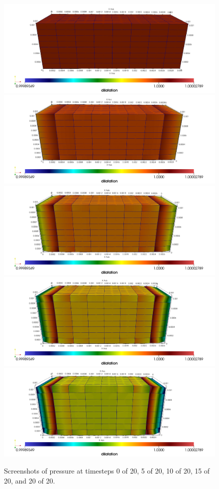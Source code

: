 \documentclass[letterpaper,11pt,oneside,titlepage]{report}
\begin{document}
{\begin{figure}
  \centering
  \includegraphics[height=0.18\textheight]{figs/00-D.png}
  \includegraphics[height=0.18\textheight]{figs/05-D.png}
  \includegraphics[height=0.18\textheight]{figs/10-D.png}
  \includegraphics[height=0.18\textheight]{figs/15-D.png}
  \includegraphics[height=0.18\textheight]{figs/20-D.png}
  \caption{Screenshots of pressure at timesteps 0 of 20, 5 of 20, 10 of 20, 15 of 20, and 20 of 20.}
\end{figure}

}
\end{document}
